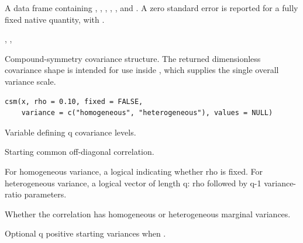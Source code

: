 \documentclass[a4paper]{book}
\begin{document}
%
\begin{Value}
A data frame containing , , ,
, , and . A zero standard error is
reported for a fully fixed native quantity, with .
\end{Value}
%
\begin{SeeAlso}\relax
{}, , 
\end{SeeAlso}
%
\begin{Examples}
\end{Examples}
%
\begin{Description}\relax
Compound-symmetry covariance structure. The returned dimensionless covariance shape is intended for use inside , which supplies the single overall variance scale.
\end{Description}
%
\begin{Usage}
\begin{verbatim}
csm(x, rho = 0.10, fixed = FALSE,
    variance = c("homogeneous", "heterogeneous"), values = NULL)
\end{verbatim}
\end{Usage}
%
\begin{Arguments}
\begin{ldescription}
\item[\code{x}] Variable defining q covariance levels.
\item[\code{rho}] Starting common off-diagonal correlation.
\item[\code{fixed}] For homogeneous variance, a logical indicating whether rho is fixed. For heterogeneous variance, a logical vector of length q: rho followed by q-1 variance-ratio parameters.
\item[\code{variance}] Whether the correlation has homogeneous or heterogeneous marginal variances.
\item[\code{values}] Optional q positive starting variances when .
\end{ldescription}
\end{Arguments}
\end{document}
